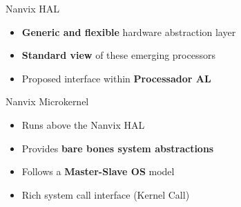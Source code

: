 		\begin{frame}[fragile]{Nanvix HAL}

			\begin{itemize}
				\item \textbf{Generic and flexible} hardware abstraction layer
				\item \textbf{Standard view} of these emerging processors
				\item Proposed interface within \textbf{Processador AL}
			\end{itemize}


		\end{frame}

		\begin{frame}[fragile]{Nanvix Microkernel}

			\begin{itemize}
				\item Runs above the Nanvix HAL
				\item Provides \textbf{bare bones system abstractions}
				\item Follows a \textbf{Master-Slave OS} model
				\item Rich system call interface (Kernel Call)
			\end{itemize}


		\end{frame}

